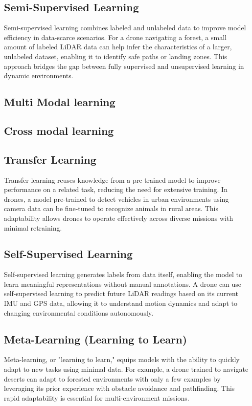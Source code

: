 \subsection{Semi-Supervised Learning}
Semi-supervised learning combines labeled and unlabeled data to improve model efficiency in data-scarce scenarios. For a drone navigating a forest, a small amount of labeled LiDAR data can help infer the characteristics of a larger, unlabeled dataset, enabling it to identify safe paths or landing zones. This approach bridges the gap between fully supervised and unsupervised learning in dynamic environments. \cite{zhu-2009-semi-supervised-learning}

\subsection{Multi Modal learning}


\subsection{Cross modal learning}

\subsection{Transfer Learning}
Transfer learning reuses knowledge from a pre-trained model to improve performance on a related task, reducing the need for extensive training. In drones, a model pre-trained to detect vehicles in urban environments using camera data can be fine-tuned to recognize animals in rural areas. This adaptability allows drones to operate effectively across diverse missions with minimal retraining. \cite{pan-2010-transfer-learning}

\subsection{Self-Supervised Learning}
Self-supervised learning generates labels from data itself, enabling the model to learn meaningful representations without manual annotations. A drone can use self-supervised learning to predict future LiDAR readings based on its current IMU and GPS data, allowing it to understand motion dynamics and adapt to changing environmental conditions autonomously. \cite{chen-2020-self-supervised}

\subsection{Meta-Learning (Learning to Learn)}
Meta-learning, or "learning to learn," equips models with the ability to quickly adapt to new tasks using minimal data. For example, a drone trained to navigate deserts can adapt to forested environments with only a few examples by leveraging its prior experience with obstacle avoidance and pathfinding. This rapid adaptability is essential for multi-environment missions. \cite{finn-2017-meta-learning}

